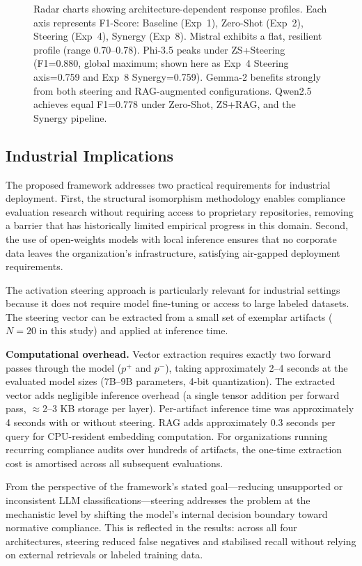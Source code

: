 \documentclass{ieeeaccess}
\begin{document}
\begin{figure}[htbp]
\begin{tikzpicture}[scale=0.85]
\end{tikzpicture}
\caption{Radar charts showing architecture-dependent response profiles. Each axis represents F1-Score: Baseline (Exp~1), Zero-Shot (Exp~2), Steering (Exp~4), Synergy (Exp~8). Mistral exhibits a flat, resilient profile (range 0.70--0.78). Phi-3.5 peaks under ZS+Steering (F1=0.880, global maximum; shown here as Exp~4 Steering axis=0.759 and Exp~8 Synergy=0.759). Gemma-2 benefits strongly from both steering and RAG-augmented configurations. Qwen2.5 achieves equal F1=0.778 under Zero-Shot, ZS+RAG, and the Synergy pipeline.}
\label{fig:radar_charts}
\end{figure}

\subsection{Industrial Implications}

The proposed framework addresses two practical requirements for industrial deployment. First, the structural isomorphism methodology enables compliance evaluation research without requiring access to proprietary repositories, removing a barrier that has historically limited empirical progress in this domain. Second, the use of open-weights models with local inference ensures that no corporate data leaves the organization's infrastructure, satisfying air-gapped deployment requirements.

The activation steering approach is particularly relevant for industrial settings because it does not require model fine-tuning or access to large labeled datasets. The steering vector can be extracted from a small set of exemplar artifacts ($N=20$ in this study) and applied at inference time.

\textbf{Computational overhead.} Vector extraction requires exactly two forward passes through the model ($p^+$ and $p^-$), taking approximately 2--4 seconds at the evaluated model sizes (7B--9B parameters, 4-bit quantization). The extracted vector adds negligible inference overhead (a single tensor addition per forward pass, $\approx$2--3 KB storage per layer). Per-artifact inference time was approximately 4 seconds with or without steering. RAG adds approximately 0.3 seconds per query for CPU-resident embedding computation. For organizations running recurring compliance audits over hundreds of artifacts, the one-time extraction cost is amortised across all subsequent evaluations.

From the perspective of the framework's stated goal---reducing unsupported or inconsistent LLM classifications---steering addresses the problem at the mechanistic level by shifting the model's internal decision boundary toward normative compliance. This is reflected in the results: across all four architectures, steering reduced false negatives and stabilised recall without relying on external retrievals or labeled training data.
\end{document}

